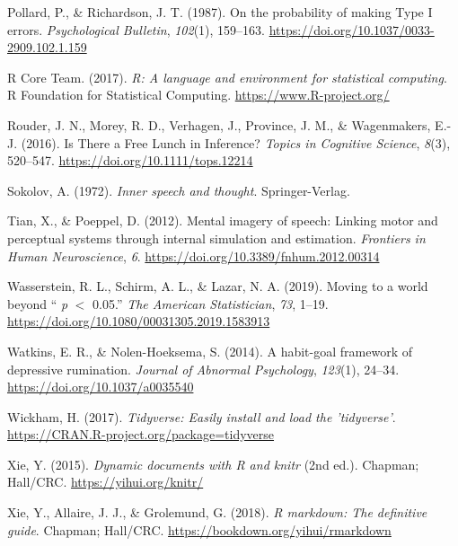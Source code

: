 \documentclass[
  english,
  man, donotrepeattitle,floatsintext]{apa6}
\newlength{\cslhangindent}
\newlength{\cslentryspacingunit} %
\newenvironment{CSLReferences}[2] %
 {%
  \setlength{\parindent}{0pt}
  \ifodd #1
  \let\oldpar\par
  \def\par{\hangindent=\cslhangindent\oldpar}
  \fi
  \setlength{\parskip}{#2\cslentryspacingunit}
 }%
 {}
\begin{document}
\begin{CSLReferences}{1}{0}
\leavevmode{}%
Pollard, P., \& Richardson, J. T. (1987). On the probability of making {Type I} errors. \emph{Psychological Bulletin}, \emph{102}(1), 159--163. \url{https://doi.org/10.1037/0033-2909.102.1.159}

\leavevmode{}%
R Core Team. (2017). \emph{R: A language and environment for statistical computing}. R Foundation for Statistical Computing. \url{https://www.R-project.org/}

\leavevmode{}%
Rouder, J. N., Morey, R. D., Verhagen, J., Province, J. M., \& Wagenmakers, E.-J. (2016). Is {There} a {Free Lunch} in {Inference}? \emph{Topics in Cognitive Science}, \emph{8}(3), 520--547. \url{https://doi.org/10.1111/tops.12214}

\leavevmode{}%
Sokolov, A. (1972). \emph{Inner speech and thought}. {Springer-Verlag}.

\leavevmode{}%
Tian, X., \& Poeppel, D. (2012). Mental imagery of speech: Linking motor and perceptual systems through internal simulation and estimation. \emph{Frontiers in Human Neuroscience}, \emph{6}. \url{https://doi.org/10.3389/fnhum.2012.00314}

\leavevmode{}%
Wasserstein, R. L., Schirm, A. L., \& Lazar, N. A. (2019). Moving to a world beyond {`` {\emph{p}} {\(<\)} 0.05.''} \emph{The American Statistician}, \emph{73}, 1--19. \url{https://doi.org/10.1080/00031305.2019.1583913}

\leavevmode{}%
Watkins, E. R., \& Nolen-Hoeksema, S. (2014). A habit-goal framework of depressive rumination. \emph{Journal of Abnormal Psychology}, \emph{123}(1), 24--34. \url{https://doi.org/10.1037/a0035540}

\leavevmode{}%
Wickham, H. (2017). \emph{Tidyverse: Easily install and load the 'tidyverse'}. \url{https://CRAN.R-project.org/package=tidyverse}

\leavevmode{}%
Xie, Y. (2015). \emph{Dynamic documents with {R} and knitr} (2nd ed.). Chapman; Hall/CRC. \url{https://yihui.org/knitr/}

\leavevmode{}%
Xie, Y., Allaire, J. J., \& Grolemund, G. (2018). \emph{R markdown: The definitive guide}. Chapman; Hall/CRC. \url{https://bookdown.org/yihui/rmarkdown}

\end{CSLReferences}
\end{document}
